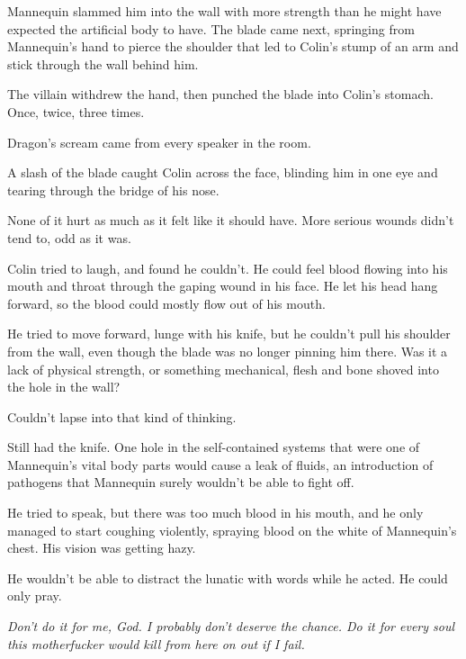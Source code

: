 Mannequin slammed him into the wall with more strength than he might have expected the artificial body to have.  The blade came next, springing from Mannequin's hand to pierce the shoulder that led to Colin's stump of an arm and stick through the wall behind him.



The villain withdrew the hand, then punched the blade into Colin's stomach.  Once, twice, three times.



Dragon's scream came from every speaker in the room.



A slash of the blade caught Colin across the face, blinding him in one eye and tearing through the bridge of his nose.



None of it hurt as much as it felt like it should have.  More serious wounds didn't tend to, odd as it was.



Colin tried to laugh, and found he couldn't.  He could feel blood flowing into his mouth and throat through the gaping wound in his face.  He let his head hang forward, so the blood could mostly flow out of his mouth.



He tried to move forward, lunge with his knife, but he couldn't pull his shoulder from the wall, even though the blade was no longer pinning him there.  Was it a lack of physical strength, or something mechanical, flesh and bone shoved into the hole in the wall?



Couldn't lapse into that kind of thinking.



Still had the knife.  One hole in the self-contained systems that were one of Mannequin's vital body parts would cause a leak of fluids, an introduction of pathogens that Mannequin surely wouldn't be able to fight off.



He tried to speak, but there was too much blood in his mouth, and he only managed to start coughing violently, spraying blood on the white of Mannequin's chest.  His vision was getting hazy.



He wouldn't be able to distract the lunatic with words while he acted.  He could only pray.



\emph{Don't do it for me, God.  I probably don't deserve the chance.  Do it for every soul this motherfucker would kill from here on out if I fail.}



